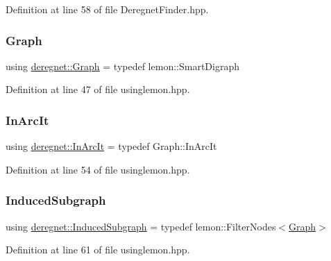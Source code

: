 Definition at line 58 of file Deregnet\+Finder.\+hpp.

\mbox{\label{namespacederegnet_a55b76c55bbabc682cbc61f8b9948799e}} 
\subsubsection{\texorpdfstring{Graph}{Graph}}
{\footnotesize\ttfamily using \hyperlink{namespacederegnet_a55b76c55bbabc682cbc61f8b9948799e}{deregnet\+::\+Graph} = typedef lemon\+::\+Smart\+Digraph}



Definition at line 47 of file usinglemon.\+hpp.

\mbox{\label{namespacederegnet_aed58be361aeda4ef7a9eaca2731ba830}} 
\subsubsection{\texorpdfstring{In\+Arc\+It}{InArcIt}}
{\footnotesize\ttfamily using \hyperlink{namespacederegnet_aed58be361aeda4ef7a9eaca2731ba830}{deregnet\+::\+In\+Arc\+It} = typedef Graph\+::\+In\+Arc\+It}



Definition at line 54 of file usinglemon.\+hpp.

\mbox{\label{namespacederegnet_ad1e0ad2af7b91e41fc1d8a15a1da5041}} 
\subsubsection{\texorpdfstring{Induced\+Subgraph}{InducedSubgraph}}
{\footnotesize\ttfamily using \hyperlink{namespacederegnet_ad1e0ad2af7b91e41fc1d8a15a1da5041}{deregnet\+::\+Induced\+Subgraph} = typedef lemon\+::\+Filter\+Nodes$<$\hyperlink{namespacederegnet_a55b76c55bbabc682cbc61f8b9948799e}{Graph}$>$}



Definition at line 61 of file usinglemon.\+hpp.

\mbox{\label{namespacederegnet_a744bad34f2de9856d36715a445f027f3}} 
